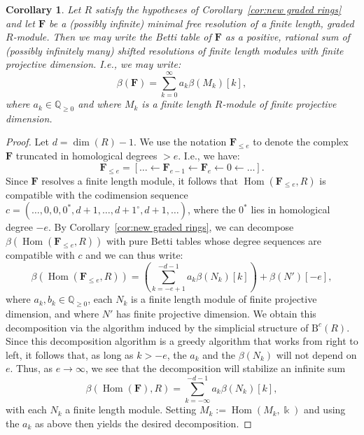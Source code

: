 \documentclass[12pt]{amsart}
\newtheorem{cor}[lemma]{Corollary}
\theoremstyle{definition}
\theoremstyle{remark}
\newtheorem{example}[lemma]{Example}
\newcommand{\Hom}{\operatorname{Hom}} %
\newcommand{\kk}{\Bbbk}
\newcommand{\QQ}{\mathbb{Q}}
\newcommand{\cc}{c}
\newcommand{\FF}{\mathbf{F}}
\newcommand{\zp}{\circ}
\newcommand{\BBQ}{\mathrm{B}}
\begin{document}
\begin{cor}\label{cor:decomp infinite}
Let $R$ satisfy the hypotheses of Corollary~\ref{cor:new graded rings} and let $\FF$ be a (possibly infinite) minimal free resolution of a finite length, graded $R$-module.  Then we may write the Betti table of $\FF$ as a positive, rational sum of (possibly infinitely many) shifted resolutions of finite length modules with finite projective dimension.  I.e., we may write:
\[
\beta(\FF)=\sum_{k=0}^\infty a_k\beta(M_k)[k],
\]
where $a_k\in \QQ_{\geq 0}$ and where $M_k$ is a finite length $R$-module of finite projective dimension.
\end{cor}
\begin{proof}
Let $d=\dim(R)-1$.  We use the notation $\FF_{\leq e}$ to denote the complex $\FF$ truncated in homological degrees $>e$.  I.e., we have:
\[
\FF_{\leq e}=[\dots \gets \FF_{e-1}\gets \FF_e \gets 0 \gets \dots].
\]
Since $\FF$ resolves a finite length module, it follows that $\Hom(\FF_{\leq e},R)$ is compatible with the codimension sequence $\cc=(\dots,0,0,0^*,d+1,\dots, d+1^\zp, d+1,\dots)$, where the $0^*$ lies in homological degree $-e$.  By Corollary~\ref{cor:new graded rings}, we can decompose $\beta(\Hom(\FF_{\leq e},R))$ with pure Betti tables whose degree sequences are compatible with $\cc$ and we can thus write:
\[
\beta(\Hom(\FF_{\leq e},R))=\left(\sum_{k=-e+1}^{-d-1} a_k\beta(N_k)[k]\right)+\beta(N')[-e],
\]
where $a_k,b_k\in \QQ_{\geq 0}$, each $N_k$ is a finite length module of finite projective dimension, and where $N'$ has finite projective dimension.  We obtain this decomposition via the algorithm induced by the simplicial structure of $\BBQ^{\cc}(R)$.  Since this decomposition algorithm is a greedy algorithm that works from right to left, it follows that, as long as $k>-e$, the $a_k$ and the $\beta(N_k)$ will not depend on $e$.  Thus, as $e\to \infty$, we see that the decomposition will stabilize an infinite sum
\[
\beta(\Hom(\FF),R)=\sum_{k=-\infty}^{-d-1} a_k\beta(N_k)[k],
\]
with each $N_k$ a finite length module.  Setting $M_k:=\Hom(M_k,\kk)$ and using the $a_k$ as above then yields the desired decomposition.
\end{proof}
%
\end{document}
